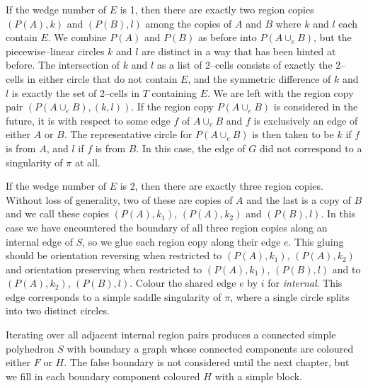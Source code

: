If the wedge number of $E$ is 1, then there are exactly two region copies $(P(A),k)$ and $(P(B),l)$ among the copies of $A$ and $B$ where $k$ and $l$ each contain $E$.
We combine $P(A)$ and $P(B)$ as before into $P(A\cup_e B)$, but the piecewise--linear circles $k$ and $l$ are distinct in a way that has been hinted at before.
The intersection of $k$ and $l$ as a list of 2--cells consists of exactly the 2--cells in either circle that do not contain $E$, and the symmetric difference of $k$ and $l$ is exactly the set of 2--cells in $T$ containing $E$.
We are left with the region copy pair $(P(A\cup_e B), (k,l))$.
If the region copy $P(A\cup_e B)$ is considered in the future, it is with respect to some edge $f$ of $A\cup_e B$ and $f$ is exclusively an edge of either $A$ or $B$.
The representative circle for $P(A\cup_e B)$ is then taken to be $k$ if $f$ is from $A$, and $l$ if $f$ is from $B$.
In this case, the edge of $G$ did not correspond to a singularity of $\pi$ at all.

If the wedge number of $E$ is 2, then there are exactly three region copies.
Without loss of generality, two of these are copies of $A$ and the last is a copy of $B$ and we call these copies $(P(A),k_1)$, $(P(A),k_2)$ and $(P(B),l)$.
In this case we have encountered the boundary of all three region copies along an internal edge of $S$, so we glue each region copy along their edge $e$.
This gluing should be orientation reversing when restricted to $(P(A),k_1)$, $(P(A),k_2)$ and orientation preserving when restricted to $(P(A),k_1)$, $(P(B),l)$ and to $(P(A),k_2)$, $(P(B),l)$.
Colour the shared edge $e$ by $i$ for \emph{internal}.
This edge corresponds to a simple saddle singularity of $\pi$, where a single circle splits into two distinct circles.

Iterating over all adjacent internal region pairs produces a connected simple polyhedron $S$ with boundary a graph whose connected components are coloured either $F$ or $H$.
The false boundary is not considered until the next chapter, but we fill in each boundary component coloured $H$ with a simple block.






